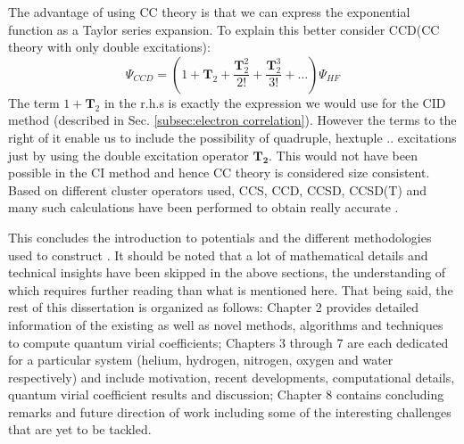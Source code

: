                 The advantage of using CC theory is that we can express the exponential function as a Taylor series expansion. To explain this better consider CCD(CC theory with only double excitations):
                \begin{equation}\label{eq:ccd}
                    \Psi_{CCD} = \left( 1 + \mathbf{T}_2 + \frac{\mathbf{T}_2^2}{2!} + \frac{\mathbf{T}_2^3}{3!} + \ldots \right) \Psi_{HF}
                \end{equation}
                The term $1 + \mathbf{T}_2$ in the r.h.s is exactly the expression we would use for the CID method (described in Sec. \ref{subsec:electron correlation}). However the terms to the right of it enable us to include the possibility of quadruple, hextuple .. excitations just by using the double excitation operator $\mathbf{T_2}$. This would not have been possible in the CI method and hence CC theory is considered size consistent. Based on different cluster operators used, CCS, CCD, CCSD, CCSD(T) and many such calculations have been performed to obtain really accurate \PESs.

                This concludes the introduction to \abInitio{} potentials and the different methodologies used to construct \PESs. It should be noted that a lot of mathematical details and technical insights have been skipped in the above sections, the understanding of which requires further reading than what is mentioned here. That being said, the rest of this dissertation is organized as follows: Chapter 2 provides detailed information of the existing as well as novel methods, algorithms and techniques to compute quantum virial coefficients; Chapters 3 through 7 are each dedicated for a particular system (helium, hydrogen, nitrogen, oxygen and water respectively) and include motivation, recent developments, computational details, quantum virial coefficient results and discussion; Chapter 8 contains concluding remarks and future direction of work including some of the interesting challenges that are yet to be tackled.
